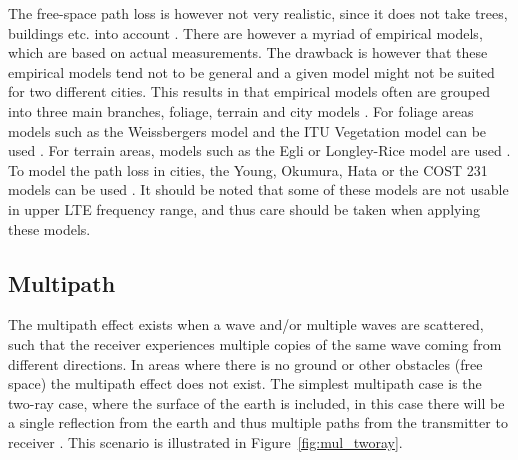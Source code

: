 The free-space path loss is however not very realistic, since it does not take trees, buildings etc. into account \cite{balanis2012antenna}. There are however a myriad of empirical models, which are based on actual measurements. The drawback is however that these empirical models tend not to be general and a given model might not be suited for two different cities. This results in that empirical models often are grouped into three main branches, foliage, terrain and city models \cite{goldsmith2005wireless}. For foliage areas models such as the Weissbergers model and the ITU Vegetation model can be used \cite{goldsmith2005wireless}. For terrain areas, models such as the Egli or Longley-Rice model are used \cite{goldsmith2005wireless}. To model the path loss in cities, the Young, Okumura, Hata or the COST 231 models can be used \cite{goldsmith2005wireless}. It should be noted that some of these models are not usable in upper LTE frequency range, and thus care should be taken when applying these models. 


\subsection{Multipath}
The multipath effect exists when a wave and/or multiple waves are scattered, such that the receiver experiences multiple copies of the same wave coming from different directions. In areas where there is no ground or other obstacles (free space) the multipath effect does not exist. The simplest multipath case is the two-ray case, where the surface of the earth is included, in this case there will be a single reflection from the earth and thus multiple paths from the transmitter to receiver \cite{parsons2000mobile}. This scenario is illustrated in Figure~\ref{fig:mul_tworay}.
 
